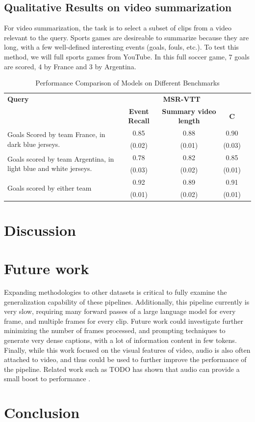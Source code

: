 \documentclass{article}
\begin{document}
\subsection{Qualitative Results on video summarization}
For video summarization, the task is to select a subset of clips from a video relevant to the query.
Sports games are desireable to summarize because they are long, with a few well-defined interesting events (goals, fouls, etc.).
To test this method, we will full sports games from YouTube.
In this full soccer game, 7 goals are scored, 4 by France and 3 by Argentina.

\begin{table}[htbp]
  \centering
  \begin{tabular}{lcccc}
    \toprule
    \textbf{Query} & \multicolumn{3}{c}{\textbf{MSR-VTT}} \\
    \cmidrule(lr){2-4}
    & \textbf{Event Recall} & \textbf{Summary video length} & \textbf{C} \\
    \midrule
    \multirow{2}{*}{Goals Scored by team France, in dark blue jerseys.} & 0.85 & 0.88 & 0.90 \\
    & (0.02) & (0.01) & (0.03) \\
    \midrule
    \multirow{2}{*}{Goals scored by team Argentina, in light blue and white jerseys.} & 0.78 & 0.82 & 0.85 \\
    & (0.03) & (0.02) & (0.01) \\
    \midrule
    \multirow{2}{*}{Goals scored by either team} & 0.92 & 0.89 & 0.91 \\
    & (0.01) & (0.02) & (0.01) \\
    \bottomrule
  \end{tabular}
  \label{tab:video_summarization}
  \caption{Performance Comparison of Models on Different Benchmarks}
\end{table}

\section{Discussion}


\section{Future work}

Expanding methodologies to other datasets is critical to fully examine the generalization capability of these pipelines.
Additionally, this pipeline currently is very slow, requiring many forward passes of a large language model for every frame, and multiple frames for every clip.
Future work could investigate further minimizing the number of frames processed, and prompting techniques to generate very dense captions, with a lot of information content in few tokens.
Finally, while this work focused on the visual features of video, audio is also often attached to video, and thus could be used to further improve the performance of the pipeline.
Related work such as TODO has shown that audio can provide a small boost to performance \cite{TODO}.

\section{Conclusion}



\end{document}
